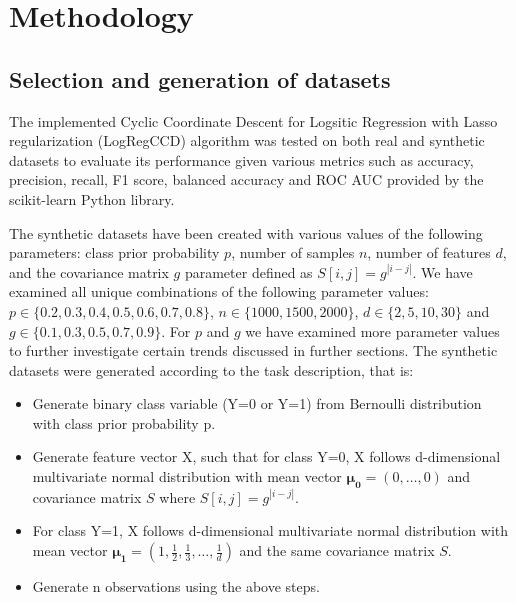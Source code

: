 \documentclass[12pt]{article}
\begin{document}
\section{Methodology}

\subsection{Selection and generation of datasets}

The implemented Cyclic Coordinate Descent for Logsitic Regression with Lasso regularization (LogRegCCD) algorithm was tested on both real and synthetic datasets to evaluate its performance given various metrics such as accuracy, precision, recall, F1 score, balanced accuracy and ROC AUC \cite{powers2011evaluation, brodersen2010balanced, fawcett2006introduction} provided by the scikit-learn \cite{scikit-learn} Python \cite{python} library. \par 



The synthetic datasets have been created with various values of the following parameters: class prior probability $p$, number of samples $n$, number of features $d$, and the covariance matrix $g$ parameter defined as $S[i,j] = g^{|i-j|}$. We have examined all unique combinations of the following parameter values: $p \in \{0.2, 0.3, 0.4, 0.5, 0.6, 0.7, 0.8\}$, $n \in \{1000, 1500, 2000\}$, $d \in \{2, 5, 10, 30\}$ and $g \in \{0.1, 0.3, 0.5, 0.7, 0.9\}$. For $p$ and $g$ we have examined more parameter values to further investigate certain trends discussed in further sections. The synthetic datasets were generated according to the task description, that is:

\begin{itemize}
    \item Generate binary class variable (Y=0 or Y=1) from Bernoulli distribution with class prior probability p.
    \item Generate feature vector X, such that for class Y=0, X follows d-dimensional multivariate normal distribution with mean vector $\boldsymbol{\mu_0} = (0,\dots,0)$ and covariance matrix $S$ where $S[i,j] = g^{|i-j|}$.
    \item For class Y=1, X follows d-dimensional multivariate normal distribution with mean vector $\boldsymbol{\mu_1} = (1,\frac{1}{2},\frac{1}{3},\dots,\frac{1}{d})$ and the same covariance matrix $S$.
    \item Generate n observations using the above steps.
\end{itemize}
\end{document}
